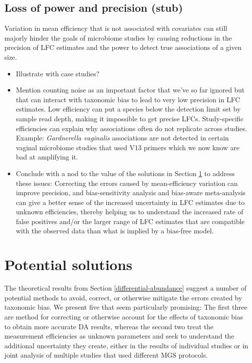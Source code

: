 \documentclass[
]{article}
\providecommand{\tightlist}{%
  \setlength{\itemsep}{0pt}\setlength{\parskip}{0pt}}
\theoremstyle{definition}
\theoremstyle{definition}
\theoremstyle{definition}
\theoremstyle{definition}
\theoremstyle{remark}
\begin{document}
\hypertarget{loss-of-power-and-precision-stub}{%
\subsection{Loss of power and precision (stub)}\label{loss-of-power-and-precision-stub}}

Variation in mean efficiency that is not associated with covariates can still majorly hinder the goals of microbiome studies by causing reductions in the precision of LFC estimates and the power to detect true associations of a given size.

\begin{itemize}
\tightlist
\item
  Illustrate with case studies?
\item
  Mention counting noise as an important factor that we've so far ignored but that can interact with taxonomic bias to lead to very low precision in LFC estimates. Low efficiency can put a species below the detection limit set by sample read depth, making it impossible to get precise LFCs. Study-specific efficiencies can explain why associations often do not replicate across studies. Example: \emph{Gardnerella vaginalis} associations are not detected in certain vaginal microbiome studies that used V13 primers which we now know are bad at amplifying it.
\item
  Conclude with a nod to the value of the solutions in Section \ref{solutions} to address these issues: Correcting the errors caused by mean-efficiency variation can improve precision, and bias-sensitivity analysis and bias-aware meta-analysis can give a better sense of the increased uncertainty in LFC estimates due to unknown efficiencies, thereby helping us to understand the increased rate of false positives and/or the larger range of LFC estimates that are compatible with the observed data than what is implied by a bias-free model.
\end{itemize}

\hypertarget{solutions}{%
\section{Potential solutions}\label{solutions}}

The theoretical results from Section \ref{differential-abundance} suggest a number of potential methods to avoid, correct, or otherwise mitigate the errors created by taxonomic bias.
We present five that seem particularly promising:
The first three are method for correcting or otherwise account for the effects of taxonomic bias to obtain more accurate DA results, whereas the second two treat the measurement efficiencies as unknown parameters and seek to understand the additional uncertainty they create, either in the results of individual studies or in joint analysis of multiple studies that used different MGS protocols.
\end{document}
